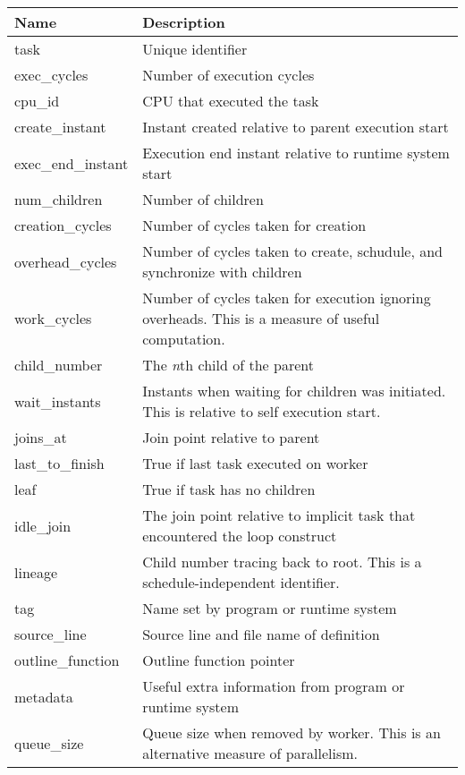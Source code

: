 \documentclass[11pt,a4paper]{article}
\begin{document}
\begin{appendices}
    \begin{longtable}{|p{4cm}|p{7cm}|}
    \hline
    \textbf{Name} & \textbf{Description} \\ \hline
    task & Unique identifier \\ \hline
    exec\_cycles & Number of execution cycles \\ \hline
    cpu\_id & CPU that executed the task \\ \hline
    create\_instant & Instant created relative to parent execution start \\ \hline
    exec\_end\_instant & Execution end instant relative to runtime system start \\ \hline
    num\_children & Number of children \\ \hline
    creation\_cycles & Number of cycles taken for creation \\ \hline
    overhead\_cycles & Number of cycles taken to create, schudule, and synchronize with children \\ \hline
    work\_cycles & Number of cycles taken for execution ignoring overheads. This is a measure of useful computation. \\ \hline
    child\_number & The \textit{n}th child of the parent \\ \hline
    wait\_instants & Instants when waiting for children was initiated. This is relative to self execution start. \\ \hline
    joins\_at & Join point relative to parent \\ \hline
    last\_to\_finish & True if last task executed on worker \\ \hline
    leaf & True if task has no children \\ \hline
    idle\_join & The join point relative to implicit task that encountered the loop construct \\ \hline
    lineage & Child number tracing back to root. This is a schedule-independent identifier.\\ \hline
    tag & Name set by program or runtime system \\ \hline
    source\_line & Source line and file name of definition \\ \hline
    outline\_function & Outline function pointer \\ \hline
    metadata & Useful extra information from program or runtime system \\ \hline
    queue\_size & Queue size when removed by worker. This is an alternative measure of parallelism. \\ \hline

\end{longtable}
\end{appendices}
\end{document}

